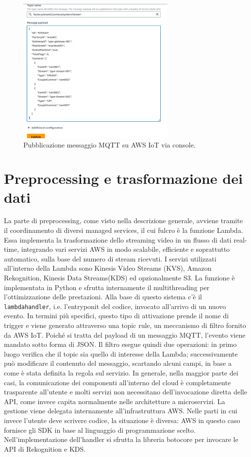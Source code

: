 \begin{figure}[htbp]
    \centering
    \includegraphics[width=0.7\textwidth]{figures/publish-example.png}
    \caption{Pubblicazione messaggio MQTT su AWS IoT via console.} 
    \label{fig:IoT-publish}
\end{figure}

 
\section{Preprocessing e trasformazione dei dati}
La parte di preprocessing, come visto nella descrizione generale, avviene tramite il coordinamento di diversi managed services, il cui fulcro è la funzione Lambda. Essa implementa la trasformazione dello streaming video in un flusso di dati real-time, integrando vari servizi AWS in modo scalabile, efficiente e soprattutto automatico, sulla base del numero di stream ricevuti. I servizi utilizzati all'interno della Lambda sono Kinesis Video Streams (KVS), Amazon Rekognition, Kinesis Data Streams(KDS) ed opzionalmente S3. La funzione è implementata in Python e sfrutta internamente il multithreading per l'ottimizzazione delle prestazioni. Alla base di questo sistema c'è il \texttt{lambda\textunderscore handler}, i.e. l'entryponit del codice, invocato all’arrivo di un nuovo evento. In termini più specifici, questo tipo di attivazione prende il nome di trigger e viene generato attraverso una topic rule, un meccanismo di filtro fornito da AWS IoT. Poiché si tratta del payload di un messaggio MQTT, l'evento viene mandato sotto forma di JSON. Il filtro esegue quindi due operazioni: in primo luogo verifica che il topic sia quello di interesse della Lambda; successivamente può modificare il contenuto del messaggio, scartando alcuni campi, in base a come è stata definita la regola sul servizio. In generale, nella maggior parte dei casi, la comunicazione dei componenti all'interno del cloud è completamente trasparente all'utente e molti servizi non necessitano dell'invocazione diretta delle API, come invece capita normalmente nelle architetture a microservizi. La gestione viene delegata internamente all'infrastruttura AWS. Nelle parti in cui invece l'utente deve scrivere codice, la situazione è diversa: AWS in questo caso fornisce gli SDK in base al linguaggio di programmazione scelto. Nell'implementazione dell'handler si sfrutta la libreria botocore per invocare le API di Rekognition e KDS.

